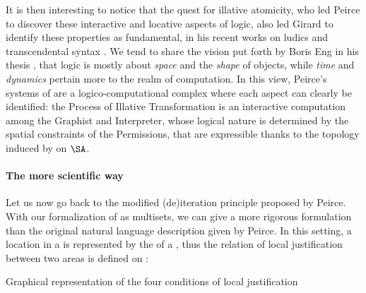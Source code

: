 \begin{scope}
It is then interesting to notice that the quest for illative atomicity, who led
Peirce to discover these interactive and locative aspects of logic, also led
Girard to identify these properties as fundamental, in his recent works on
ludics \cite{girard_locus_2001} and transcendental syntax
\cite{eng_exegesis_2023}. We tend to share the vision put forth by Boris Eng in
his thesis \cite[\S 24.4]{eng_exegesis_2023}, that logic is mostly about
\emph{space} and the \emph{shape} of objects, while \emph{time} and
\emph{dynamics} pertain more to the realm of computation. In this view, Peirce's
systems of  are a logico-computational complex where each aspect can clearly
be identified: the Process of Illative Transformation is an interactive
computation among the Graphist and Interpreter, whose logical nature is
determined by the spatial constraints of the Permissions, that are expressible
thanks to the topology induced by  on $\SA$.

\paragraph{The more scientific way}

Let us now go back to the modified (de)iteration principle proposed by Peirce.
With our formalization of  as multisets, we can give a more rigorous
formulation than the original natural language description given by
Peirce. In this setting, a location in a  is represented by the
 of a , thus the relation of local justification between two areas is
defined on :

\begin{marginfigure}
  
  \caption{Graphical representation of the four conditions of local
  justification}
\end{marginfigure}


\end{scope}
